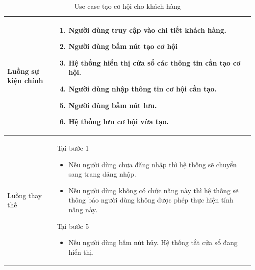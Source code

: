 \documentclass[12pt,a4paper]{article}
\begin{document}
\begin{table}[H]
\begin{tabular}{|p{3.5cm}|p{11.5cm}|c|}
            Luồng sự kiện chính & \vspace{-.8cm}\begin{enumerate}
                                                    \item Người dùng truy cập vào chi tiết khách hàng.
                                                    \item Người dùng bấm nút tạo cơ hội
                                                    \item Hệ thống hiển thị cửa sổ các thông tin cần tạo cơ hội.
                                                    \item Người dùng nhập thông tin cơ hội cần tạo.
                                                    \item Người dùng bấm nút lưu.
                                                    \item Hệ thống lưu cơ hội vừa tạo.
            \end{enumerate}
            \\
            \hline
            Luồng thay thế & Tại bước 1\newline
            \vspace{-.8cm}\begin{itemize}
                              \item Nếu người dùng chưa đăng nhập thì hệ thống sẽ chuyển sang trang đăng nhập.
                              \item Nếu người dùng không có chức năng này thì hệ thống sẽ thông báo người dùng không được phép thực hiện tính năng này.
            \end{itemize}
            Tại bước 5\newline
            \vspace{-.8cm}\begin{itemize}
                              \item Nếu người dùng bấm nút hủy. Hệ thống tắt cửa sổ đang hiển thị.
            \end{itemize}
            \\ \hline
        \end{tabular}
        \caption{Use case tạo cơ hội cho khách hàng}

    \end{table}
\end{document}
